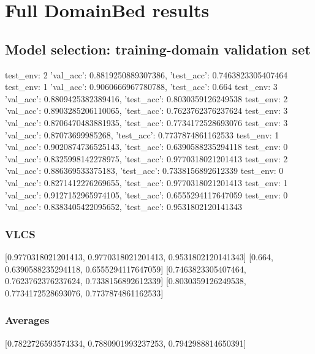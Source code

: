 \documentclass{article}
\begin{document}
\section{Full DomainBed results}

\subsection{Model selection: training-domain validation set}
test_env: 2
{'val_acc': 0.8819250889307386, 'test_acc': 0.7463823305407464}
test_env: 1
{'val_acc': 0.9060666967780788, 'test_acc': 0.664}
test_env: 3
{'val_acc': 0.8809425382389416, 'test_acc': 0.8030359126249538}
test_env: 2
{'val_acc': 0.8903285206110065, 'test_acc': 0.7623762376237624}
test_env: 3
{'val_acc': 0.8706470483881935, 'test_acc': 0.7734172528693076}
test_env: 3
{'val_acc': 0.87073699985268, 'test_acc': 0.7737874861162533}
test_env: 1
{'val_acc': 0.9020874736525143, 'test_acc': 0.6390588235294118}
test_env: 0
{'val_acc': 0.8325998142278975, 'test_acc': 0.9770318021201413}
test_env: 2
{'val_acc': 0.886369533375183, 'test_acc': 0.7338156892612339}
test_env: 0
{'val_acc': 0.8271412276269655, 'test_acc': 0.9770318021201413}
test_env: 1
{'val_acc': 0.9127152965974105, 'test_acc': 0.6555294117647059}
test_env: 0
{'val_acc': 0.8383405422095652, 'test_acc': 0.9531802120141343}

\subsubsection{VLCS}
[0.9770318021201413, 0.9770318021201413, 0.9531802120141343]
[0.664, 0.6390588235294118, 0.6555294117647059]
[0.7463823305407464, 0.7623762376237624, 0.7338156892612339]
[0.8030359126249538, 0.7734172528693076, 0.7737874861162533]

\begin{center}
\end{center}

\subsubsection{Averages}
[0.7822726593574334, 0.7880901993237253, 0.7942988814650391]

\begin{center}
\end{center}
\end{document}
